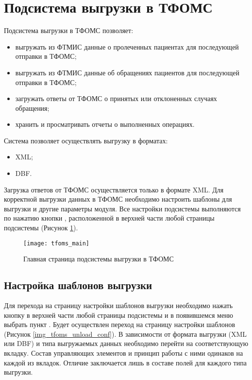 \newpage
\section{Подсистема выгрузки в ТФОМС}

Подсистема выгрузки в ТФОМС позволяет:
\begin{itemize}
 \item 	выгружать из ФТМИС данные о пролеченных пациентах для последующей отправки в ТФОМС;
 \item выгружать из ФТМИС данные об обращениях пациентов для последующей отправки в ТФОМС;
 \item загружать ответы от ТФОМС о принятых или отклоненных случаях обращения;
 \item хранить и просматривать отчеты о выполненных операциях.
\end{itemize}
 
Система позволяет осуществлять выгрузку в форматах:
\begin{itemize}
 \item XML;
 \item DBF.
\end{itemize}
 
Загрузка ответов от ТФОМС осуществляется только в формате XML.
Для корректной выгрузки данных в ТФОМС необходимо настроить шаблоны для выгрузки и другие параметры модуля. Все настройки подсистемы выполняются по нажатию кнопки , расположенной в верхней части любой страницы подсистемы (Рисунок \ref{img_tfoms_main}).

\begin{figure}[ht]\centering
 \texttt{[image: tfoms\_main]}
 \caption{Главная страница подсистемы выгрузки в ТФОМС}
 \label{img_tfoms_main}
\end{figure}

\subsection{Настройка шаблонов выгрузки}

Для перехода на страницу настройки шаблонов выгрузки необходимо нажать кнопку   в верхней части любой страницы подсистемы и в появившемся меню выбрать пункт . Будет осуществлен переход на страницу настройки шаблонов (Рисунок \ref{img_tfoms_unload_conf}). В зависимости от формата выгрузки (XML или DBF) и типа выгружаемых данных необходимо перейти на соответствующую вкладку. Состав управляющих элементов и принцип работы с ними одинаков на каждой из вкладок. Отличие заключается лишь в составе полей для каждого типа выгрузки.

